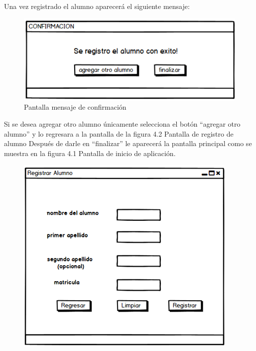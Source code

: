 Una vez registrado el alumno aparecerá el siguiente mensaje:
\begin{figure}[h]
	\centering
	\includegraphics[scale=0.5]{./HistoriasUsuario/imagenes/IHU4.png}
	\caption{Pantalla mensaje de confirmación}
\end{figure}
Si se desea agregar otro alumno únicamente selecciona el botón “agregar otro alumno” y lo regresara a la pantalla de la figura 4.2 Pantalla de registro de alumno
Después de darle en “finalizar” le aparecerá la pantalla principal como se muestra en la figura 4.1 Pantalla de inicio de aplicación.
\begin{figure}[h]
	\centering
	\includegraphics[scale=0.5]{./HistoriasUsuario/imagenes/IHU2.png}
\end{figure}
